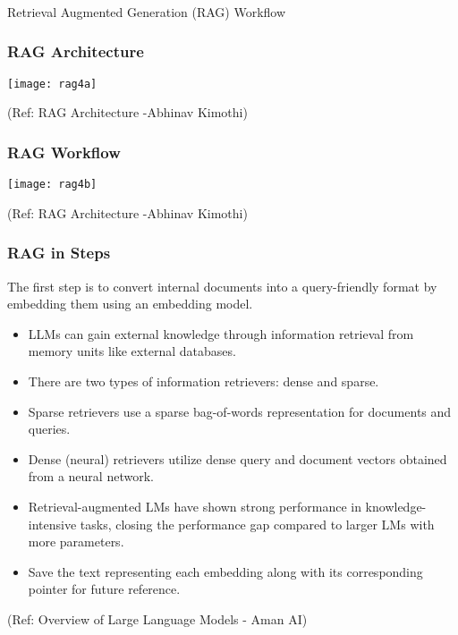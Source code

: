 \begin{frame}[fragile]\frametitle{}
\begin{center}
{\Large Retrieval Augmented Generation (RAG) Workflow}
\end{center}
\end{frame}



\begin{frame}[fragile]\frametitle{RAG Architecture}


		\begin{center}
		\texttt{[image: rag4a]}
		\end{center}

{\tiny (Ref: RAG Architecture -Abhinav  Kimothi)}

\end{frame}

\begin{frame}[fragile]\frametitle{RAG Workflow}


		\begin{center}
		\texttt{[image: rag4b]}
		\end{center}

{\tiny (Ref: RAG Architecture -Abhinav  Kimothi)}

\end{frame}

\begin{frame}[fragile]\frametitle{RAG in Steps}

The first step is to convert internal documents into a query-friendly format by embedding them using an embedding model.

\begin{itemize}
\item LLMs can gain external knowledge through information retrieval from memory units like external databases.
\item There are two types of information retrievers: dense and sparse.
\item Sparse retrievers use a sparse bag-of-words representation for documents and queries.
\item Dense (neural) retrievers utilize dense query and document vectors obtained from a neural network.
\item Retrieval-augmented LMs have shown strong performance in knowledge-intensive tasks, closing the performance gap compared to larger LMs with more parameters.
\item Save the text representing each embedding along with its corresponding pointer for future reference.
\end{itemize}

{\tiny (Ref: Overview of Large Language Models - Aman AI)}

\end{frame}

